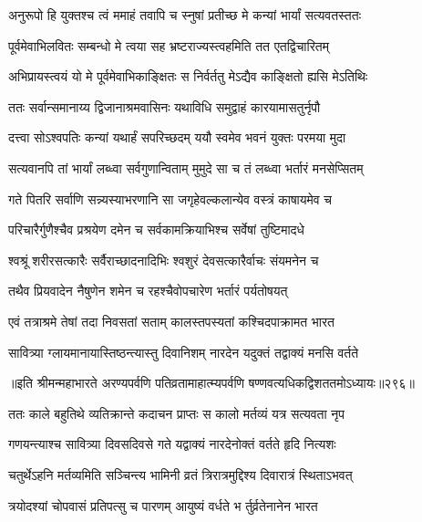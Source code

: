 \begin{center}
\twolineshloka
{अनुरूपो हि युक्तश्च त्वं ममाहं तवापि च}
{स्नुषां प्रतीच्छ मे कन्यां भार्यां सत्यवतस्ततः}




\twolineshloka
{पूर्वमेवाभिलवितः सम्बन्धो मे त्वया सह}
{भ्रष्टराज्यस्त्वहमिति तत एतद्विचारितम्}


\twolineshloka
{अभिप्रायस्त्वयं यो मे पूर्वमेवाभिकाङ्क्षितः}
{स निर्वर्ततु मेऽद्यैव काङ्क्षितो ह्यसि मेऽतिथिः}


\twolineshloka
{ततः सर्वान्समानाय्य द्विजानाश्रमवासिनः}
{यथाविधि समुद्वाहं कारयामासतुर्नृपौ}


\twolineshloka
{दत्त्वा सोऽश्वपतिः कन्यां यथार्हं सपरिच्छदम्}
{ययौ स्वमेव भवनं युक्तः परमया मुदा}


\twolineshloka
{सत्यवानपि तां भार्यां लब्ध्वा सर्वगुणान्विताम्}
{मुमुदे सा च तं लब्ध्वा भर्तारं मनसेप्सितम्}


\twolineshloka
{गते पितरि सर्वाणि सन्न्यस्याभरणानि सा}
{जगृहेवल्कलान्येव वस्त्रं काषायमेव च}


\twolineshloka
{परिचारैर्गुणैश्चैव प्रश्रयेण दमेन च}
{सर्वकामक्रियाभिश्च सर्वेषां तुष्टिमादधे}


\twolineshloka
{श्वश्रूं शरीरसत्कारैः सर्वैराच्छादनादिभिः}
{श्वशुरं देवसत्कारैर्वाचः संयमनेन च}


\twolineshloka
{तथैव प्रियवादेन नैषुणेन शमेन च}
{रहश्चैवोपचारेण भर्तारं पर्यतोषयत्}


\twolineshloka
{एवं तत्राश्रमे तेषां तदा निवसतां सताम्}
{कालस्तपस्यतां कश्चिदपाक्रामत भारत}


\twolineshloka
{सावित्र्या ग्लायमानायास्तिष्ठन्त्यास्तु दिवानिशम्}
{नारदेन यदुक्तं तद्वाक्यं मनसि वर्तते}


॥इति श्रीमन्महाभारते अरण्यपर्वणि
पतिव्रतामाहात्म्यपर्वणि षण्णवत्यधिकद्विशततमोऽध्यायः॥२९६॥




\twolineshloka
{ततः काले बहुतिथे व्यतिक्रान्ते कदाचन}
{प्राप्तः स कालो मर्तव्यं यत्र सत्यवता नृप}


\twolineshloka
{गणयन्त्याश्च सावित्र्या दिवसदिवसे गते}
{यद्वाक्यं नारदेनोक्तं वर्तते हृदि नित्यशः}


\twolineshloka
{चतुर्थेऽहनि मर्तव्यमिति सञ्चिन्त्य भामिनी}
{व्रतं त्रिरात्रमुद्दिश्य दिवारात्रं स्थिताऽभवत्}


\twolineshloka
{त्रयोदश्यां चोपवासं प्रतिपत्सु च पारणम्}
{आयुष्यं वर्धते भ र्तुर्व्रतेनानेन भारत}



\end{center}
